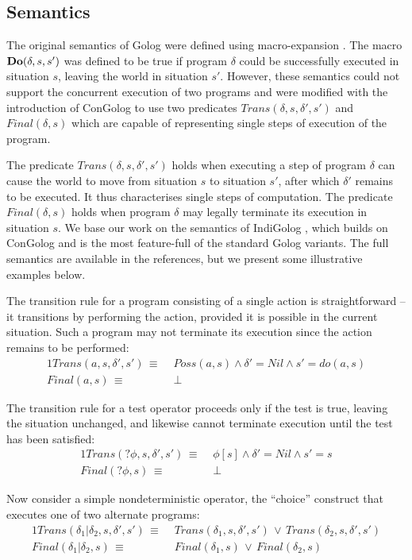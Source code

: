 \subsection{Semantics}

The original semantics of Golog were defined using macro-expansion
\citep{levesque97golog}. The macro $\mathbf{Do}(\delta,s,s')$ was defined
to be true if program $\delta$ could be successfully executed in
situation $s$, leaving the world in situation $s'$. However, these
semantics could not support the concurrent execution of two programs
and were modified with the introduction of ConGolog \citep{giacomo00congolog}
to use two predicates $Trans(\delta,s,\delta',s')$ and $Final(\delta,s)$
which are capable of representing single steps of execution of the
program.

The predicate $Trans(\delta,s,\delta',s')$ holds when executing a
step of program $\delta$ can cause the world to move from situation
$s$ to situation $s'$, after which $\delta'$ remains to be executed.
It thus characterises single steps of computation. The predicate $Final(\delta,s)$
holds when program $\delta$ may legally terminate its execution in
situation $s$. We base our work on the semantics of IndiGolog \citep{giacomo99indigolog},
which builds on ConGolog \citep{giacomo00congolog} and is the most
feature-full of the standard Golog variants. The full semantics are
available in the references, but we present some illustrative examples
below.

The transition rule for a program consisting of a single action is
straightforward -- it transitions by performing the action, provided
it is possible in the current situation. Such a program may not terminate
its execution since the action remains to be performed:\begin{alignat*}{1}
Trans(a,s,\delta',s')\,\equiv\, & \, Poss(a,s)\wedge\delta'=Nil\wedge s'=do(a,s)\\
Final(a,s)\,\equiv\, & \,\bot\end{alignat*}


The transition rule for a test operator proceeds only if the test
is true, leaving the situation unchanged, and likewise cannot terminate
execution until the test has been satisfied:\begin{alignat*}{1}
Trans(?\phi,s,\delta',s')\,\equiv\, & \,\phi[s]\wedge\delta'=Nil\wedge s'=s\\
Final(?\phi,s)\,\equiv\, & \,\bot\end{alignat*}


Now consider a simple nondeterministic operator, the {}``choice''
construct that executes one of two alternate programs:\begin{alignat*}{1}
Trans(\delta_{1}|\delta_{2},s,\delta',s')\,\equiv\, & \, Trans(\delta_{1},s,\delta',s')\,\vee\, Trans(\delta_{2},s,\delta',s')\\
Final(\delta_{1}|\delta_{2},s)\,\equiv\, & \, Final(\delta_{1},s)\,\vee\, Final(\delta_{2},s)\end{alignat*}


